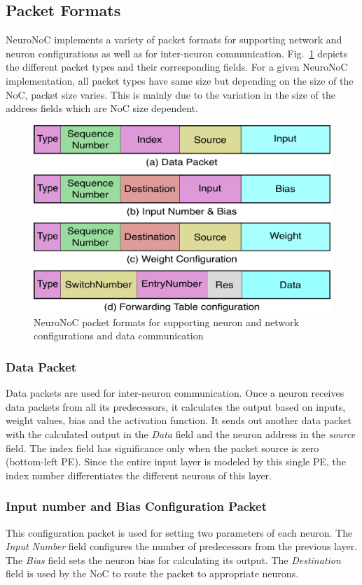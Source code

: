 \subsection{Packet Formats}
\label{subsecpktformat}
NeuroNoC implements a variety of packet formats for supporting network and neuron configurations as well as for inter-neuron communication.  
Fig.~\ref{figure:pktformat} depicts the different packet types and their corresponding fields.
For a given NeuroNoC implementation, all packet types have same size but depending on the size of the NoC, packet size varies.
This is mainly due to the variation in the size of the address fields which are NoC size dependent. 
\begin{figure}[t!]
	\begin{center}
    \includegraphics[width=0.8\columnwidth]{Figures/pktformat.pdf}
    \caption{NeuroNoC packet formats for supporting neuron and network configurations and data communication} 
    \label{figure:pktformat}
    \end{center}
\end{figure}

\subsubsection*{\bf Data Packet}
Data packets are used for inter-neuron communication.
Once a neuron receives data packets from all its predecessors, it calculates the output based on inputs, weight values, bias and the activation function.
It sends out another data packet with the calculated output in the \emph{Data} field and the neuron address in the \emph{source} field.
The index field has significance only when the packet source is zero (bottom-left PE).
Since the entire input layer is modeled by this single PE, the index number differentiates the different neurons of this layer.
\subsubsection*{\bf Input number and Bias Configuration Packet}
This configuration packet is used for setting two parameters of each neuron.
The \emph{Input Number} field configures the number of predecessors from the previous layer.
The \emph{Bias} field sets the neuron bias for calculating its output.
The \emph{Destination} field is used by the NoC to route the packet to appropriate neurons. 
